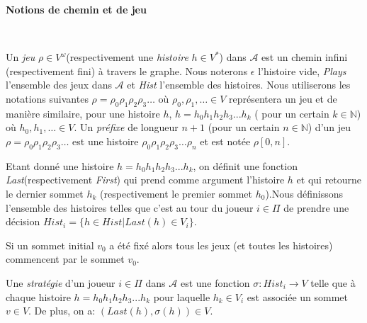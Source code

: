 \noindent\textbf{Notions de chemin et de jeu}

\\

Un \textit{jeu} $\rho \in V^{\omega}$(respectivement une \textit{histoire} $h \in V^{*}$) dans $\mathcal{A}$ est un chemin infini (respectivement fini) à travers le graphe. Nous noterons $\epsilon$ l'histoire vide, \textit{Plays} l'ensemble des jeux dans $\mathcal{A}$ et \textit{Hist} l'ensemble des histoires. Nous utiliserons les notations suivantes $\rho = \rho _{0}  \rho _{1} \rho _{2}\rho _{3} \ldots$ où $\rho _{0},  \rho _{1},\ldots \in V$ représentera un jeu et de manière similaire, pour une histoire $h$, $ h = h_{0} h_{1} h_{2} h_{3} ... h_{k}$ ( pour un certain $k \in \mathbb{N}$) où  $h_{0}, h_{1}, \ldots \in V$.
Un \textit{préfixe} de longueur $n+1$ (pour un certain $n\in \mathbb{N}$) d'un jeu $\rho = \rho _{0}  \rho _{1} \rho _{2}\rho _{3} \ldots$ est une histoire $\rho _{0}  \rho _{1} \rho _{2}\rho _{3} \ldots \rho _{n}$ et est notée $\rho[0,n]$.

Etant donné une histoire $ h = h_{0} h_{1} h_{2} h_{3} ... h_{k}$,  on définit une fonction \textit{Last}(respectivement \textit{First}) qui prend comme argument l'histoire $h$ et qui retourne le dernier sommet $h_{k}$ (respectivement le premier sommet $h_{0}$).Nous définissons l'ensemble des histoires telles que c'est au tour du joueur $i \in \Pi$ de prendre une décision $Hist_{i} = \{ h \in Hist | Last(h) \in V_{i} \}$.

\begin{rem}
	Si un sommet initial $v_{0}$ a été fixé alors tous les jeux (et toutes les histoires) commencent par le sommet $v_{0}.$\\
\end{rem}


\begin{defi}[Stratégie]
	Une \textit{stratégie} d'un joueur $i \in \Pi$ dans $\mathscr{A}$ est une fonction \mbox{$\sigma:Hist_{i} \rightarrow V$} telle que à chaque histoire $ h = h_{0} h_{1} h_{2} h_{3} ... h_{k}$ pour laquelle $h_{k} \in V_{i}$ est associée un sommet $v \in V$. De plus, on a: $(Last(h),\sigma(h))\in V$.
\end{defi}

